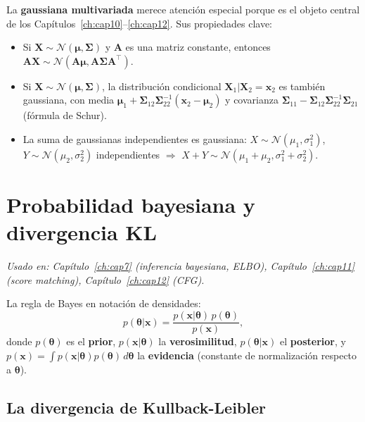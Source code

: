\medskip
La \textbf{gaussiana multivariada} merece atención especial porque es el objeto
central de los Capítulos~\ref{ch:cap10}--\ref{ch:cap12}. Sus propiedades clave:
\begin{itemize}
  \item Si $\bm{X}\sim\mathcal{N}(\bm{\mu},\bm{\Sigma})$ y $\bm{A}$ es una
        matriz constante, entonces $\bm{A}\bm{X}\sim\mathcal{N}(\bm{A}\bm{\mu},
        \bm{A}\bm{\Sigma}\bm{A}^\top)$.
  \item Si $\bm{X}\sim\mathcal{N}(\bm{\mu},\bm{\Sigma})$, la distribución
        condicional $\bm{X}_1|\bm{X}_2 = \bm{x}_2$ es también gaussiana, con
        media $\bm{\mu}_1 + \bm{\Sigma}_{12}\bm{\Sigma}_{22}^{-1}(\bm{x}_2 -
        \bm{\mu}_2)$ y covarianza $\bm{\Sigma}_{11} - \bm{\Sigma}_{12}
        \bm{\Sigma}_{22}^{-1}\bm{\Sigma}_{21}$ (fórmula de Schur).
  \item La suma de gaussianas independientes es gaussiana:
        $X\sim\mathcal{N}(\mu_1,\sigma_1^2)$, $Y\sim\mathcal{N}(\mu_2,\sigma_2^2)$
        independientes $\Rightarrow$ $X+Y\sim\mathcal{N}(\mu_1+\mu_2,
        \sigma_1^2+\sigma_2^2)$.
\end{itemize}

\section{Probabilidad bayesiana y divergencia KL}
\label{sec:ap_bayesiana}

\textit{Usado en: Capítulo~\ref{ch:cap7} (inferencia bayesiana, ELBO),
Capítulo~\ref{ch:cap11} (score matching), Capítulo~\ref{ch:cap12} (CFG).}

\medskip
La regla de Bayes en notación de densidades:
\[
  p(\bm{\theta}|\bm{x}) = \frac{p(\bm{x}|\bm{\theta})\,p(\bm{\theta})}{p(\bm{x})},
\]
donde $p(\bm{\theta})$ es el \textbf{prior}, $p(\bm{x}|\bm{\theta})$ la
\textbf{verosimilitud}, $p(\bm{\theta}|\bm{x})$ el \textbf{posterior}, y
$p(\bm{x}) = \int p(\bm{x}|\bm{\theta})p(\bm{\theta})\,d\bm{\theta}$ la
\textbf{evidencia} (constante de normalización respecto a $\bm{\theta}$).

\subsection{La divergencia de Kullback-Leibler}
\label{subsec:ap_kl}

